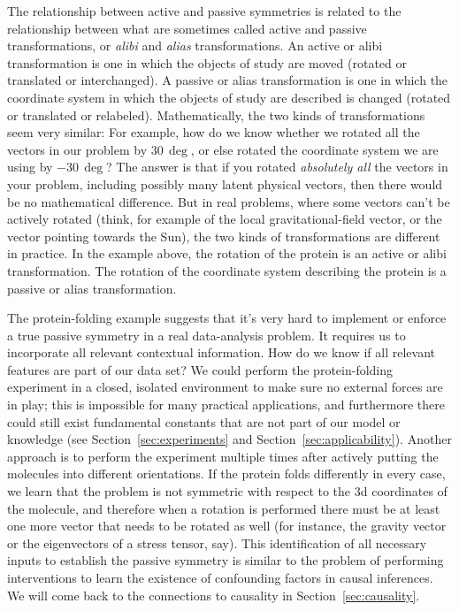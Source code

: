 \documentclass{article}
\theoremstyle{plain}
\theoremstyle{definition}
\theoremstyle{remark}
\newcommand{\sectionname}{Section}
\newcommand{\secref}[1]{\sectionname~\ref{#1}}
\begin{document}
The relationship between active and passive symmetries is related to the relationship between what are sometimes called active and passive transformations, or \emph{alibi} and \emph{alias} transformations.
An active or alibi transformation is one in which the objects of study are moved (rotated or translated or interchanged).
A passive or alias transformation is one in which the coordinate system in which the objects of study are described is changed (rotated or translated or relabeled).
Mathematically, the two kinds of transformations seem very similar:
For example, how do we know whether we rotated all the vectors in our problem by $30\,\deg$, or else rotated the coordinate system we are using by $-30\,\deg$?
The answer is that if you rotated \emph{absolutely all} the vectors in your problem, including possibly many latent physical vectors, then there would be no mathematical difference.
But in real problems, where some vectors can't be actively rotated (think, for example of the local gravitational-field vector, or the vector pointing towards the Sun), the two kinds of transformations are different in practice.
In the example above, the rotation of the protein is an active or alibi transformation.
The rotation of the coordinate system describing the protein is a passive or alias transformation.

The protein-folding example suggests that it's very hard to implement or enforce a true passive symmetry in a real data-analysis problem.
It requires us to incorporate all relevant contextual information.
How do we know if all relevant features are part of our data set?
We could perform the protein-folding experiment in a closed, isolated environment to make sure no external forces are in play;
this is impossible for many practical applications, and furthermore there could still exist fundamental constants that are not part of our model or knowledge (see \secref{sec:experiments} and \secref{sec:applicability}).
Another approach is to perform the experiment multiple times after actively putting the molecules into different orientations.
If the protein folds differently in every case, we learn that the problem is not symmetric with respect to the 3d coordinates of the molecule, and therefore when a rotation is performed there must be at least one more vector that needs to be rotated as well (for instance, the gravity vector or the eigenvectors of a stress tensor, say).
This identification of all necessary inputs to establish the passive symmetry is similar to the problem of performing interventions to learn the existence of confounding factors in causal inferences.
We will come back to the connections to causality in \secref{sec:causality}.
\end{document}
